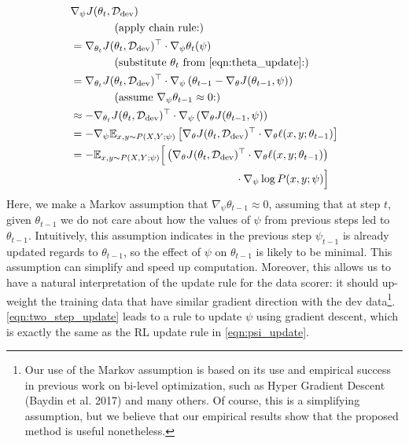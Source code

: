 \begin{equation}
  \label{eqn:two_step_update}
  \begin{aligned}
   & \nabla_\psi J(\theta_t, \mathcal{D}_\text{dev})\\
   & \quad\quad\quad\quad \text{(apply chain rule:)} \\
    &= \nabla_{\theta_t} J(\theta_t, \mathcal{D}_\text{dev})^\top \cdot \nabla_\psi \theta_t(\psi) \\
    & \quad\quad\quad\quad  \text{(substitute $\theta_t$ from \autoref{eqn:theta_update}:)} \\
      &= \nabla_{\theta_t} J(\theta_t, \mathcal{D}_\text{dev})^\top \cdot \nabla_\psi \left( \theta_{t-1} - \nabla_\theta J(\theta_{t-1}, \psi) \right)  \\
      & \quad\quad\quad\quad  \text{(assume $\nabla_\psi \theta_{t-1} \approx 0$:)} \\
      &\approx -\nabla_{\theta_t} J(\theta_t, \mathcal{D}_\text{dev})^\top \cdot \nabla_\psi  \left( \nabla_\theta J(\theta_{t-1}, \psi) \right) \\
      &= -\nabla_\psi \mathbb{E}_{x, y \sim P(X, Y; \psi)} \left[\nabla_\theta J(\theta_t, \mathcal{D}_\text{dev})^\top \cdot \nabla_\theta \ell(x, y; \theta_{t-1} )\right] \\
    &= -\mathbb{E}_{x, y \sim P(X, Y; \psi)} \Big[\left( \nabla_\theta J(\theta_t, \mathcal{D}_\text{dev})^\top \cdot \nabla_\theta \ell(x, y; \theta_{t-1} ) \right) \\
    & \quad\quad\quad\quad\quad\quad\quad\quad\quad\quad\quad\quad\quad\quad\quad \cdot \nabla_\psi \log{P(x, y; \psi)} \Big]
  \end{aligned}
\end{equation}
Here, we make a Markov assumption that $\nabla_\psi \theta_{t-1} \approx 0$, assuming that at step $t$, given $\theta_{t-1}$ we do not care about how the values of $\psi$ from previous steps led to $\theta_{t-1}$. Intuitively, this assumption indicates in the previous step $\psi_{t-1}$ is already updated regards to $\theta_{t-1}$, so the effect of $\psi$ on $\theta_{t-1}$ is likely to be minimal. This assumption can simplify and speed up computation. Moreover, this allows us to have a natural interpretation of the update rule for the data scorer: it should up-weight the training data that have similar gradient direction with the dev data\footnote{Our use of the Markov assumption is based on its use and empirical success in previous work on bi-level optimization, such as Hyper Gradient Descent (Baydin et al. 2017) and many others. Of course, this is a simplifying assumption, but we believe that our empirical results show that the proposed method is useful nonetheless.}. \autoref{eqn:two_step_update} leads to a rule to update $\psi$ using gradient descent, which is exactly the same as the RL update rule in \autoref{eqn:psi_update}.
